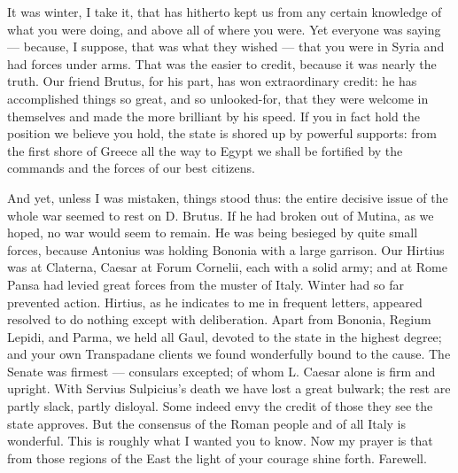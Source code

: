 

 It was winter, I take it, that has hitherto kept us from any certain knowledge of what you were doing, and above all of where you were. Yet everyone was saying --- because, I suppose, that was what they wished --- that you were in Syria and had forces under arms. That was the easier to credit, because it was nearly the truth. Our friend Brutus, for his part, has won extraordinary credit: he has accomplished things so great, and so unlooked-for, that they were welcome in themselves and made the more brilliant by his speed. If you in fact hold the position we believe you hold, the state is shored up by powerful supports: from the first shore of Greece all the way to Egypt we shall be fortified by the commands and the forces of our best citizens.

 And yet, unless I was mistaken, things stood thus: the entire decisive issue of the whole war seemed to rest on D. Brutus. If he had broken out of Mutina, as we hoped, no war would seem to remain. He was being besieged by quite small forces, because Antonius was holding Bononia with a large garrison. Our Hirtius was at Claterna, Caesar at Forum Cornelii, each with a solid army; and at Rome Pansa had levied great forces from the muster of Italy. Winter had so far prevented action. Hirtius, as he indicates to me in frequent letters, appeared resolved to do nothing except with deliberation. Apart from Bononia, Regium Lepidi, and Parma, we held all Gaul, devoted to the state in the highest degree; and your own Transpadane clients we found wonderfully bound to the cause. The Senate was firmest --- consulars excepted; of whom L. Caesar alone is firm and upright. With Servius Sulpicius's death we have lost a great bulwark; the rest are partly slack, partly disloyal. Some indeed envy the credit of those they see the state approves. But the consensus of the Roman people and of all Italy is wonderful. This is roughly what I wanted you to know. Now my prayer is that from those regions of the East the light of your courage shine forth. Farewell.
